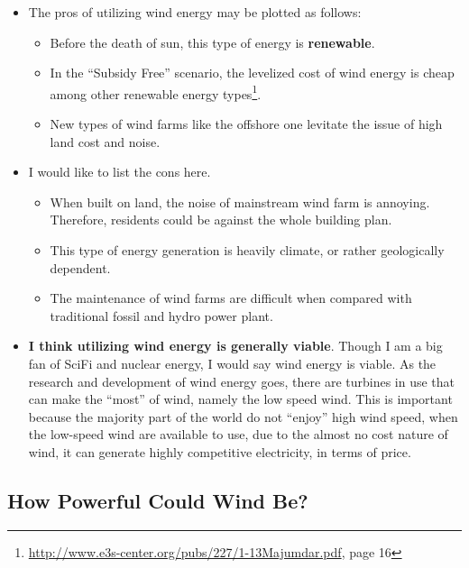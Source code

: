 \documentclass[12pt]{article}
\begin{document}
\begin{itemize}
\item The pros of utilizing wind energy may be plotted as follows:
  \begin{itemize}
  \item Before the death of sun, this type of energy is
    \textbf{renewable}.
  \item In the ``Subsidy Free'' scenario, the levelized cost of wind
    energy is cheap among other renewable energy
    types\footnote{\url{http://www.e3s-center.org/pubs/227/1-13Majumdar.pdf},
      page 16}. 
  \item New types of wind farms like the offshore one levitate the
    issue of high land cost and noise.
  \end{itemize}
\item I would like to list the cons here.
  \begin{itemize}
  \item When built on land, the noise of mainstream wind farm is
    annoying. Therefore, residents could be against the whole building
    plan. 
  \item This type of energy generation is heavily climate, or rather
    geologically dependent. 
  \item The maintenance of wind farms are difficult when compared with
    traditional fossil and hydro power plant.
  \end{itemize}
\item \textbf{I think utilizing wind energy is generally
    viable}.  Though I am a big fan of SciFi and nuclear energy, I
  would say wind energy is viable. As the research and development of
  wind energy goes, there are turbines in use that can make the
  ``most'' of wind, namely the low speed wind. This is important
  because the majority part of the world do not ``enjoy'' high wind
  speed, when the low-speed wind are available to use, due to the
  almost no cost nature of wind, it can generate highly competitive
  electricity, in terms of price.
\end{itemize}

\subsection{How Powerful Could Wind Be?}
\label{sec:how-powerful-could}
\end{document}
